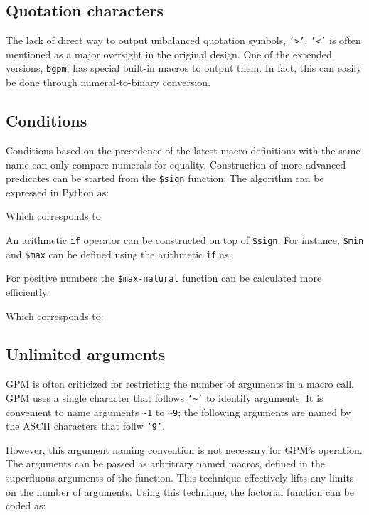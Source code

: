 \documentclass[letterpaper,10pt]{article}
\begin{document}
\subsection{Quotation characters}
The lack of direct way to output unbalanced quotation symbols, \texttt{'>'}, \texttt{'<'} is
often mentioned as a major oversight in the original design. One of the 
extended versions, \texttt{bgpm}, has special built-in macros to output them.
In fact, this can easily be done through numeral-to-binary conversion.


\subsection{Conditions}
Conditions based on the precedence of the latest macro-definitions 
with the same name can only %
compare numerals for equality. Construction of more advanced predicates
can be started from the \texttt{\$sign} function; The algorithm can be
expressed in Python as:

Which corresponds to

An arithmetic \texttt{if} operator can be constructed on top of \texttt{\$sign}.
For instance, \texttt{\$min} and \texttt{\$max} can be defined using the arithmetic 
\texttt{if} as:

For positive numbers the \texttt{\$max-natural} function can be calculated more efficiently.

Which corresponds to:


\subsection[short]{Unlimited arguments}
GPM is often criticized for restricting the number of arguments in a macro call.
GPM uses a single character that follows \texttt{'\textasciitilde{}'} to identify arguments. It is convenient
to name arguments \texttt{\textasciitilde{}1} to \texttt{\textasciitilde{}9}; the following arguments are named by
the ASCII characters that follw \texttt{'9'}. 

However, this argument naming convention is not necessary for GPM's operation. The arguments
can be passed as arbritrary named macros, defined in the superfluous arguments of the function.
This technique effectively lifts any limits on the number of arguments. 
Using this technique, the factorial function can be coded as:

\end{document}
